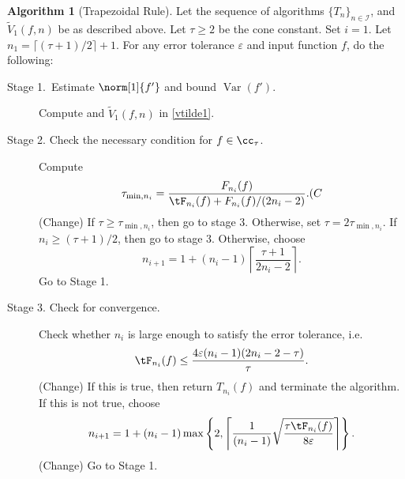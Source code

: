 \documentclass{iitthesis}
\DeclareMathOperator{\Var}{Var}
\theoremstyle{definition}
\newtheorem{algo}{Algorithm}
\theoremstyle{remark}
\begin{document}


\begin{algo}[Trapezoidal Rule] \label{multistagetrapalgo}
Let the sequence of algorithms $\{T_n\}_{n\in \mathcal{I}}$, %
and $\widetilde{V}_1(f,n)$ be as described above.
Let $\tau\ge2$ be the cone constant. Set $i=1$. Let $n_1=\lceil(\tau+1)/2\rceil+1$. For any error tolerance $\varepsilon$ and input function $f$, do the following:
\begin{description}
\item[Stage 1.\ Estimate {$\norm[1]{f'}$} and bound {$\Var(f')$}.] Compute  and $\widetilde{V}_1(f,n)$ in \eqref{vtilde1}.

\item[Stage 2. Check the necessary condition for $f \in \cc_{\tau}$.] Compute
    \begin{align*}
     \tau_{\min,n_i} =  \frac{F_{n_i}(f)}{\tF_{n_i}(f)+F_{n_i}(f)/(2n_i-2)}. (C
    \end{align*}
    (Change)
If $\tau \ge \tau_{\min,n_i}$, then go to stage 3.  Otherwise, set $\tau = 2\tau_{\min,n_i}$.  If $n_i \ge (\tau+1)/2$, then go to stage 3.  Otherwise, choose
$$n_{i+1}=1+ (n_i-1)\left\lceil\frac{\tau+1}{2n_i-2}\right\rceil.$$
Go to Stage 1.

\item[Stage 3. Check for convergence.] Check whether $n_i$ is large enough to satisfy the error tolerance, i.e.
    \begin{equation*}
     \tF_{n_i}(f) \le \frac{4\varepsilon(n_i-1)(2n_i-2 - \tau)}{\tau}.
    \end{equation*}
    (Change)
If this is true, then return $T_{n_i}(f)$ and terminate the algorithm.   If this is not true, choose
$$
n_{i+1}=1+ (n_i-1)\max\left\{2,\left\lceil\frac{1}{(n_i-1)}\sqrt{\frac{\tau \tF_{n_i}(f)}{8\varepsilon}}\right\rceil\right\}.
$$
(Change)
Go to Stage 1.
\end{description}
\end{algo}
\end{document}

